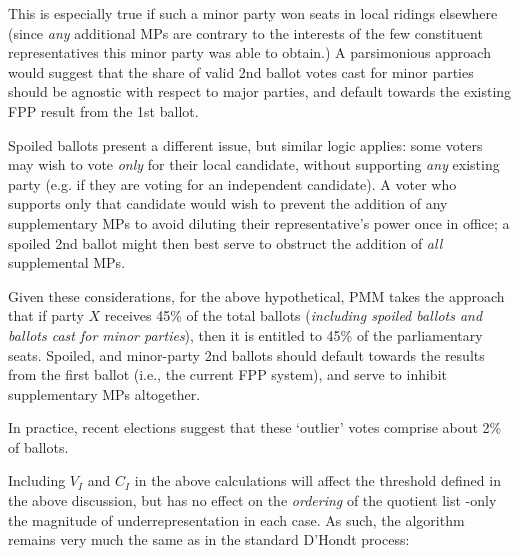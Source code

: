 This is especially true if such a minor party won seats in local ridings elsewhere (since \emph{any} additional MPs are contrary to the interests of the few constituent representatives this minor party was able to obtain.) 
A parsimonious approach would suggest that the share of valid 2nd ballot votes cast for minor parties should be agnostic with respect to major parties, and default towards the existing FPP result from the 1st ballot. 

Spoiled ballots present a different issue, but similar logic applies: some voters may wish to vote \emph{only} for their local candidate, without supporting \emph{any} existing party (e.g. if they are voting for an independent candidate). 
A voter who supports only that candidate would wish to prevent the addition of any supplementary MPs to avoid diluting their representative's power once in office; a spoiled 2nd ballot might then best serve to obstruct the addition of \emph{all} supplemental MPs.

Given these considerations, for the above hypothetical, PMM takes the approach that if party $X$ receives 45\% of the total ballots (\emph{including spoiled ballots and ballots cast for minor parties}), then it is entitled to 45\% of the parliamentary seats. 
Spoiled, and minor-party 2nd ballots should default towards the results from the first ballot (i.e., the current FPP system), and serve to inhibit supplementary MPs altogether. 

In practice, recent elections suggest that these `outlier' votes comprise about 2\% of ballots. 

Including $V_I$ and $C_I$ in the above calculations will affect the threshold defined in the above discussion, but has no effect on the \emph{ordering} of the quotient list \--only the magnitude of underrepresentation in each case. 
As such, the algorithm remains very much the same as in the standard D'Hondt process:

